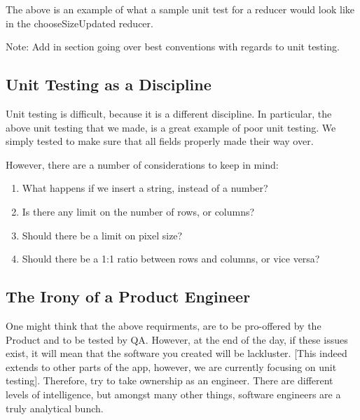 The above is an example of what a sample unit test for a reducer would look like
in the chooseSizeUpdated reducer.

Note: Add in section going over best conventions with regards to unit testing.


\subsection{ Unit Testing as a Discipline }

Unit testing is difficult, because it is a different discipline. In particular,
the above unit testing that we made, is a great example of poor unit testing.
We simply tested to make sure that all fields properly made their way over.

However, there are a number of considerations to keep in mind:
\begin{enumerate}
  \item What happens if we insert a string, instead of a number?
  \item Is there any limit on the number of rows, or columns?
  \item Should there be a limit on pixel size?
  \item Should there be a 1:1 ratio between rows and columns, or vice versa?
\end{enumerate}

\subsection{ The Irony of a Product Engineer }
One might think that the above requirments, are to be pro-offered by the Product
and to be tested by QA. However, at the end of the day, if these issues exist,
it will mean that the software you created will be lackluster. [This indeed
extends to other parts of the app, however, we are currently focusing on
unit testing]. Therefore, try to take ownership as an engineer. There are
different levels of intelligence, but amongst many other things, software
engineers are a truly analytical bunch.
